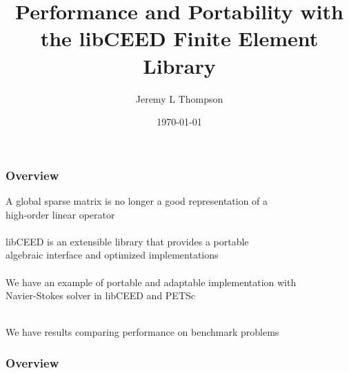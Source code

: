 \documentclass{beamer}
\title[libCEED Finite Element Library]{Performance and Portability with\\the libCEED Finite Element Library} %
\author{Jeremy L Thompson} %
\institute[CU Boulder] %
{University of Colorado Boulder \\ %
\medskip
\textit{jeremy.thompson@colorado.edu} %
}
\date{\today} %
\begin{document}
\begin{frame}
\titlepage %
\end{frame}


\begin{frame}
\begin{center}
\frametitle{Overview}

A global sparse matrix is no longer a good representation of a\\high-order linear operator\\

~\\

libCEED is an extensible library that provides a portable\\algebraic interface and optimized implementations\\

~\\

We have an example of portable and adaptable implementation with\\Navier-Stokes solver in libCEED and PETSc

~\\

We have results comparing performance on benchmark problems

\end{center}
\end{frame}
 

\begin{frame}
\frametitle{Overview} %
\tableofcontents %
\end{frame}

\end{document}
